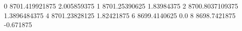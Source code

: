 0 8701.419921875 2.005859375
1 8701.25390625 1.83984375
2 8700.8037109375 1.3896484375
4 8701.23828125 1.82421875
6 8699.4140625 0.0
8 8698.7421875 -0.671875

